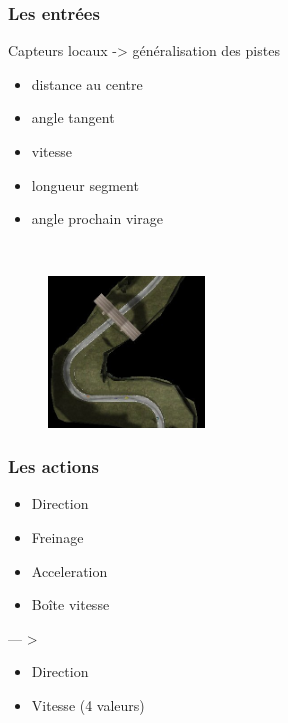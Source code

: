 \begin{frame}
 \frametitle{Les entrées}
  
  
  \begin{minipage}{0.5\textwidth}
 \begin{flushleft}
 Capteurs locaux -> généralisation des pistes
 \begin{itemize}
  \item distance au centre 
  \item angle tangent
  \item vitesse
  \item longueur segment
  \item angle prochain virage
 \end{itemize}
  \end{flushleft}
 \end{minipage}
 ~
 \begin{minipage}{0.4\textwidth}
 \begin{flushright}
  \begin{figure}
      \includegraphics[height=4cm]{images/track.jpg} \\
  \end{figure}
  \end{flushright}
 \end{minipage}

\end{frame}


\begin{frame}
 \frametitle{Les actions}

   \begin{minipage}{0.4\textwidth}
 \begin{flushleft}
 \begin{itemize}
  \item Direction
  \item Freinage
  \item Acceleration
  \item Boîte vitesse
 \end{itemize}
  \end{flushleft}
 \end{minipage}
 --- >
 \begin{minipage}{0.4\textwidth}
 \begin{flushright}
 \begin{itemize}
  \item Direction
  \item Vitesse (4 valeurs)
 \end{itemize}
  \end{flushright}
 \end{minipage}
 
\end{frame}

